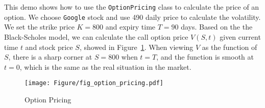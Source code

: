 
This demo shows how to use the \texttt{OptionPricing} class to calculate the
price of an option.  We choose \texttt{Google} stock and use 490 daily price to
calculate the volatility.  We set the strike price $K = 800$ and expiry time $T
= 90$ days. Based on the the Black-Scholes model, we can calculate the call
option price $V(S, t)$ given current time $t$ and stock price $S$, showed in
Figure~\ref{fig_option_pricing}. When viewing $V$ as the function of $S$, there
is a sharp corner at $S = 800$ when $t = T$, and the function is smooth at $t =
0$, which is the same as the real situation in the market.

\begin{figure}[htbp]
  \centering
  \texttt{[image: Figure/fig\_option\_pricing.pdf]}
  \caption{Option Pricing}\label{fig_option_pricing}
\end{figure}

